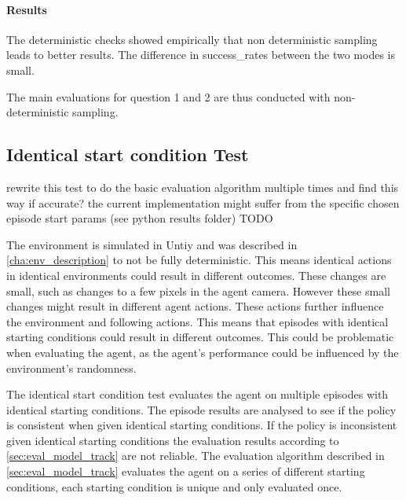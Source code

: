 \paragraph{Results}
The deterministic checks showed empirically that non deterministic sampling leads to better results. The difference in success\_rates between the two modes is small.

The main evaluations for question 1 and 2 are thus conducted with non-deterministic sampling.




\subsection{Identical start condition Test}

rewrite this test to do the basic evaluation algorithm multiple times and find this way if accurate?
the current implementation might suffer from the specific chosen episode start params (see python results folder) TODO

The environment is simulated in Untiy and was described in \ref{cha:env_description} to not be fully deterministic. This means identical actions in identical environments could result in different outcomes. These changes are small, such as changes to a few pixels in the agent camera. However these small changes might result in different agent actions. These actions further influence the environment and following actions. This means that episodes with identical starting conditions could result in different outcomes. This could be problematic when evaluating the agent, as the agent's performance could be influenced by the environment's randomness. 

The identical start condition test evaluates the agent on multiple episodes with identical starting conditions. The episode results are analysed to see if the policy is consistent when given identical starting conditions. If the policy is inconsistent given identical starting conditions the evaluation results according to \ref{sec:eval_model_track} are not reliable. The evaluation algorithm described in \ref{sec:eval_model_track} evaluates the agent on a series of different starting conditions, each starting condition is unique and only evaluated once.

